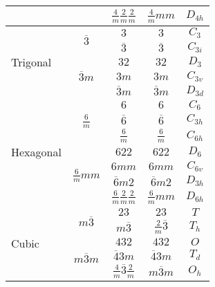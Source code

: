 \documentclass[12pt]{article}
\begin{document}
\begin{table}[h]
\begin{tabular}{lcccc}
                               &                                 & $\displaystyle \frac{4}{m}\frac{2}{m}\frac{2}{m}$ & $\displaystyle \frac{4}{m}mm$ & $D_{4h}$ \\ [1.5ex]
    \hline
    \multirow{5}{*}{Trigonal } & \multirow{2}{*}{$\overline{3}$} & $3$ & $3$ & $C_3$\\
                               &                                 & $\overline{3}$ & $\overline{3}$ & $C_{3i}$ \\
                               \cline{2-5}
							  & \multirow{3}{*}{$\overline{3}m$} & $32$ & $32$ & $D_3$\\
                               &                                 & $3m$ & $3m$ & $C_{3v}$ \\
                               &                                 & $\overline{3}m$ & $\overline{3}m$ & $D_{3d}$ \\ 
    \hline
    \multirow{7}{*}{Hexagonal} & \multirow{3}{*}{$\displaystyle \frac{6}{m}$} & $6$ & $6$ & $C_6$\\
                               &                                 & $\overline{6}$ & $\overline{6}$ & $C_{3h}$ \\
                               &                                 & $\displaystyle \frac{6}{m}$ & $\displaystyle \frac{6}{m}$ & $C_{6h}$ \\[1.5ex]
                               \cline{2-5}
							  & \multirow{4}{*}{$\displaystyle \frac{6}{m}mm$} & $622$ & $622$ & $D_6$\\
                               &                                 & $6mm$ & $6mm$ & $C_{6v}$ \\
                               &                                 & $\overline{6}m2$ & $\overline{6}m2$ & $D_{3h}$ \\ 
                               &                                 & $\displaystyle \frac{6}{m}\frac{2}{m}\frac{2}{m}$ & $\displaystyle \frac{6}{m}mm$ & $D_{6h}$ \\  [1.5ex]
    \hline
    \multirow{5}{*}{Cubic}    & \multirow{2}{*}{$m\overline{3}$} & $23$ & $23$ & $T$\\
                               &                                 & $m\overline{3}$ & $\displaystyle \frac{2}{m}\overline{3}$ & $T_h$ \\
                               \cline{2-5}
							  & \multirow{3}{*}{$m\overline{3}m$} & $432$ & $432$ & $O$\\
                               &                                 & $\overline{4}3m$ & $\overline{4}3m$ & $T_d$ \\
                               &                                 & $\displaystyle \frac{4}{m}\overline{3}\frac{2}{m}$ & $m\overline{3}m$ & $O_h$ \\ [1.5ex]
    \hline  
  \end{tabular}
\end{table}
\end{document}
